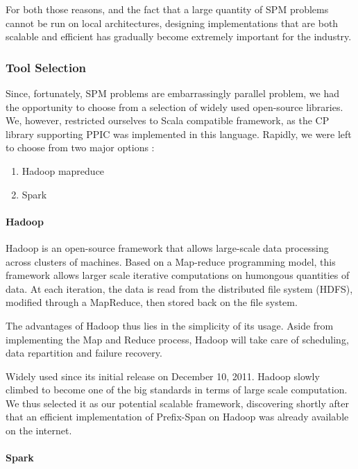 \documentclass{eplmastersthesis}
\begin{document}
For both those reasons, and the fact that a large quantity of SPM problems cannot be run on local architectures, designing implementations that are both scalable and efficient has gradually become extremely important for the industry.

\subsubsection{Tool Selection}

Since, fortunately, SPM problems are embarrassingly parallel problem, we had the opportunity to choose from a selection of widely used open-source libraries. We, however, restricted ourselves to Scala compatible framework, as the CP library supporting PPIC was implemented in this language. Rapidly, we were left to choose from two major options :

\begin{enumerate}
\item Hadoop mapreduce
\item Spark
\end{enumerate}

\paragraph{Hadoop}

Hadoop is an open-source framework that allows large-scale data processing across clusters of machines. Based on a Map-reduce programming model, this framework allows larger scale iterative computations on humongous quantities of data. At each iteration, the data is read from the distributed file system (HDFS), modified through a MapReduce, then stored back on the file system. \newline

The advantages of Hadoop thus lies in the simplicity of its usage. Aside from implementing the Map and Reduce process, Hadoop will take care of scheduling, data repartition and failure recovery. \newline

Widely used since its initial release on December 10, 2011. Hadoop slowly climbed to become one of the big standards in terms of large scale computation. We thus selected it as our potential scalable framework, discovering shortly after that an efficient implementation of Prefix-Span on Hadoop was already available on the internet.

\paragraph{Spark}
\end{document}
